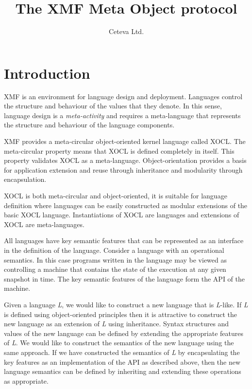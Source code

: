 \documentclass{article}
\title{The XMF Meta Object protocol}
\author{Ceteva Ltd.}
\begin{document}
\maketitle

\section{Introduction}

XMF is an environment for language design and deployment. Languages control the structure and
behaviour of the values that they denote. In this sense, language design is a {\em meta-activity}
and requires a meta-language that represents the structure and behaviour of the language components.

XMF provides a meta-circular object-oriented kernel language called XOCL. The meta-circular
property means that XOCL is defined completely in itself. This property validates XOCL as a
meta-language. Object-orientation provides a basis for application extension and reuse through
inheritance and modularity through encapsulation. 

XOCL is both meta-circular and object-oriented, it is suitable for language definition where 
languages can be easily constructed as modular extensions of the basic XOCL language. Instantiations
of XOCL are languages and extensions of XOCL are meta-languages.

All languages have key semantic features that can be represented as an interface in the definition
of the language. Consider a language with an operational semantics. In this case programs written
in the language may be viewed as controlling a machine that contains the state of the execution
at any given snapshot in time. The key semantic features of the language form the API of the
machine.

Given a language {\em L}, we would like to construct a new language that is {\em L}-like. If {\em L}
is defined using object-oriented principles then it is attractive to construct the new language as
an extension of {\em L} using inheritance. Syntax structures and values of the new language can be 
defined by extending the appropriate features of {\em L}. We would like to construct the semantics 
of the new language using the same approach. If we have constructed the semantics of {\em L} by
encapsulating the key features as an implementation of the API as described above, then the new
language semantics can be defined by inheriting and extending these operations as appropriate.
\end{document}
